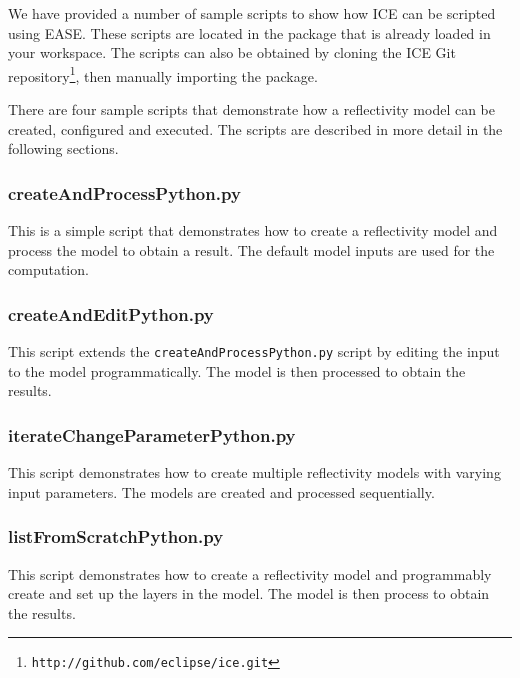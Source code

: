 \lstset{basicstyle=\ttfamily\scriptsize, breaklines}
\makeatletter
\def\lst@lettertrue{\let\lst@ifletter\iffalse}
\makeatother

We have provided a number of sample scripts to show how ICE can be
scripted using EASE.
These scripts are located in the
 package that is already loaded
in your workspace. The scripts can also be obtained by cloning the ICE Git
repository\footnote{\texttt{http://github.com/eclipse/ice.git}},
then manually importing the 
package.

There are four sample scripts that demonstrate how a reflectivity model
can be created, configured and executed. The scripts are described in
more detail in the following sections.

\subsubsection{createAndProcessPython.py} 

This is a simple script
that demonstrates how to create a reflectivity model and process the model to
obtain a result. The default model inputs are used for the computation.



\subsubsection{createAndEditPython.py} 

This script extends the
\texttt{createAndProcessPython.py} script by editing the input to the model
programmatically. The model is then processed to obtain the results.



\subsubsection{iterateChangeParameterPython.py} 
This script demonstrates how to create
multiple reflectivity models with varying input parameters. The models are created
and processed sequentially.



\subsubsection{listFromScratchPython.py} 
This script demonstrates how to create a
reflectivity model and programmably create and set up the layers in the model.
The model is then process to obtain the results.


